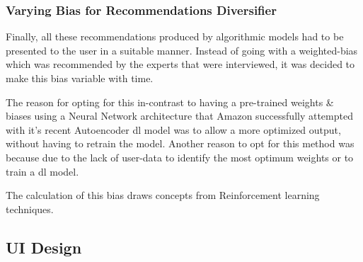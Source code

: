 
% 




\subsubsection{Varying Bias for Recommendations Diversifier}
Finally, all these recommendations produced by algorithmic models had to be presented to the user in a suitable manner. Instead of going with a weighted-bias which was recommended by the experts that were interviewed, it was decided to make this bias variable with time. 

The reason for opting for this in-contrast to having a pre-trained weights \& biases using a Neural Network architecture that Amazon successfully attempted with it's recent Autoencoder \autocite{larry_history_2019} \gls{dl} model was to allow a more optimized output, without having to retrain the model. Another reason to opt for this method was because due to the lack of user-data to identify the most optimum weights or to train a \gls{dl} model.

The calculation of this bias draws concepts from Reinforcement learning techniques.







\subsection{UI Design}

